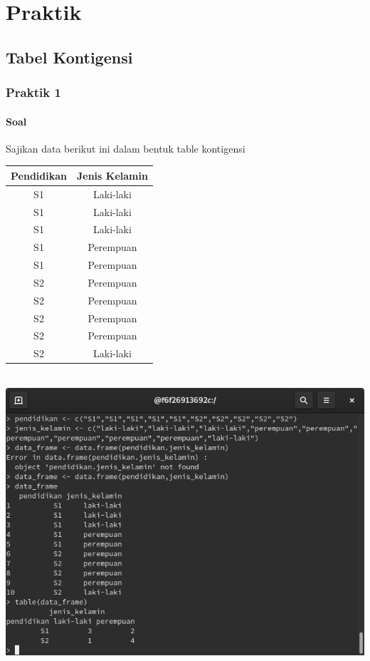 \documentclass[a4paper,12pt]{article}
\begin{document}
\section{Praktik}
\subsection{Tabel Kontigensi}
\subsubsection{Praktik 1}
\paragraph{Soal\\}
Sajikan data berikut ini dalam bentuk table kontigensi 
\begin{table}[!ht]
	\begin{tabular}{|c|c|}
		\hline 
		Pendidikan & Jenis Kelamin \\ 
		\hline 
		S1 & Laki-laki \\ 
		\hline 
		S1 & Laki-laki \\ 
		\hline 
		S1 & Laki-laki \\ 
		\hline 
		S1 & Perempuan \\ 
		\hline 
		S1 & Perempuan \\ 
		\hline 
		S2 & Perempuan \\ 
		\hline 
		S2 & Perempuan \\ 
		\hline 
		S2 & Perempuan \\ 
		\hline 
		S2 & Perempuan \\ 
		\hline 
		S2 & Laki-laki \\ 
		\hline 
	\end{tabular}
\end{table} 
\\\includegraphics[width=\linewidth]{1}
\end{document}
